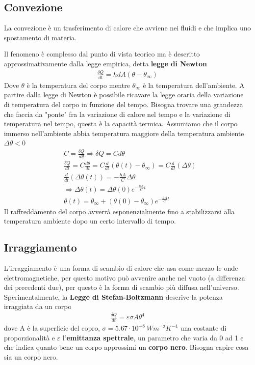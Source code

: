 \documentclass[
10pt, %
a4paper, %
oneside, %
headinclude,footinclude, %
BCOR5mm, %
]{scrartcl}
\begin{document}
\subsection{Convezione}
\begin{definition}[Convezione]
	La convezione è un trasferimento di calore che avviene nei fluidi e che implica uno spostamento di materia. 
\end{definition}
Il fenomeno è complesso dal punto di vista teorico ma è descritto approssimativamente dalla legge empirica, detta \textbf{legge di Newton}
\begin{align*}
	\frac{\delta Q}{dt} = h dA (\theta-\theta_{\infty})
\end{align*}
Dove $\theta$ è la temperatura del corpo mentre $\theta_{\infty}$ è la temperatura dell'ambiente. A partire dalla legge di Newton è possibile ricavare la legge oraria della variazione di temperatura del corpo in funzione del tempo. Bisogna trovare una grandezza che faccia da "ponte" fra la variazione di calore nel tempo e la variazione di temperatura nel tempo, questa è la capacità termica. Assumiamo che il corpo immerso nell'ambiente abbia temperatura maggiore della temperatura ambiente \(\Delta\theta < 0\)
\begin{align*}
	&C = \frac{\delta Q}{d\theta} \Rightarrow \delta Q = C d\theta\\
	&\frac{\delta Q }{dt} =C \frac{d\theta}{dt}=C \frac{d}{dt}(\theta(t)-\theta_{\infty}) = C \frac{d}{dt} (\Delta\theta)\\
	&\frac{d}{dt} (\Delta\theta(t)) = -\frac{h A}{C}\Delta\theta\\
	&\Rightarrow\Delta\theta(t) =  \Delta\theta(0) e^{-\frac{h A }{C}t}\\
	&\theta(t) = \theta_{\infty} + (\theta(0)-\theta_{\infty}) e^{-\frac{h A }{C}t}
\end{align*} 
Il raffreddamento del corpo avverrà esponenzialmente fino a stabilizzarsi alla temperatura ambiente dopo un certo intervallo di tempo. 
\subsection{Irraggiamento}
L'irraggiamento è una forma di scambio di calore che usa come mezzo le onde elettromagnetiche, per questo motivo può avvenire anche nel vuoto (a differenza dei precedenti due), per questo è la forma di scambio più diffusa nell'universo. Sperimentalmente, la \textbf{Legge di Stefan-Boltzmann} descrive la potenza irraggiata da un corpo
\begin{align*}
	\frac{\delta Q }{dt} = \varepsilon \sigma A \theta^4
\end{align*}
dove A è la superficie del copro, \(\sigma = 5.67 \cdot 10^{-8}\ W m^{-2}K^{-4}\) una costante di proporzionalità e $\varepsilon$ l'\textbf{emittanza spettrale}, un parametro che varia da 0 ad 1 e che indica quanto bene un corpo approssimi un \textbf{corpo nero}. Bisogna capire cosa sia un corpo nero. 
\end{document}
